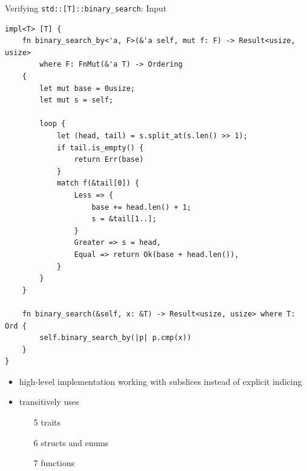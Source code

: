 \documentclass{beamer}
\begin{document}
\begin{frame}[fragile]{Verifying \texttt{std::[T]::binary\_search}: Input}
  \begin{verbatim}
impl<T> [T] {
    fn binary_search_by<'a, F>(&'a self, mut f: F) -> Result<usize, usize>
        where F: FnMut(&'a T) -> Ordering
    {
        let mut base = 0usize;
        let mut s = self;

        loop {
            let (head, tail) = s.split_at(s.len() >> 1);
            if tail.is_empty() {
                return Err(base)
            }
            match f(&tail[0]) {
                Less => {
                    base += head.len() + 1;
                    s = &tail[1..];
                }
                Greater => s = head,
                Equal => return Ok(base + head.len()),
            }
        }
    }

    fn binary_search(&self, x: &T) -> Result<usize, usize> where T: Ord {
        self.binary_search_by(|p| p.cmp(x))
    }
}
  \end{verbatim}

  \begin{itemize}
    \item high-level implementation working with subslices instead of explicit indicing
    \item transitively uses
      \begin{itemize}
        \item[5] traits
        \item[6] structs and enums
        \item[7] functions
      \end{itemize}
  \end{itemize}
\end{frame}
\end{document}
